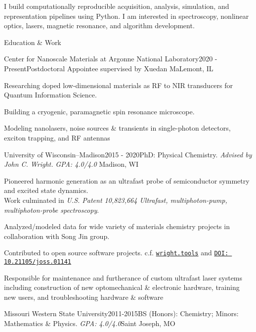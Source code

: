 \documentclass{resume} %
\begin{document}

I build computationally reproducible acquisition, analysis, simulation, and representation pipelines using Python.
I am interested in spectroscopy, nonlinear optics, lasers, magnetic resonance, and algorithm development.





   

\begin{rSection}{Education \& Work}

\begin{rSubsection}{Center for Nanoscale Materials at Argonne National Laboratory}{2020 - Present}{Postdoctoral Appointee supervised by Xuedan Ma}{Lemont, IL}
	\item Researching doped low-dimensional materials as RF to NIR transducers for Quantum Information Science.
	\item Building a cryogenic, paramagnetic spin resonance microscope.
	\item Modeling nanolasers, noise sources \& transients in single-photon detectors, exciton trapping, and RF antennas  
\end{rSubsection}

\begin{rSubsection}{University of Wisconsin--Madison}{2015 - 2020}{PhD: Physical Chemistry. \emph{Advised by John C. Wright.} \emph{GPA: 4.0/4.0} }{Madison, WI}
	\item Pioneered harmonic generation as an ultrafast probe of semiconductor symmetry and excited state dynamics.\\ Work culminated in \emph{U.S. Patent 10,823,664  Ultrafast, multiphoton-pump, multiphoton-probe spectroscopy}.
	\item Analyzed/modeled data for wide variety of materials chemistry projects in collaboration with Song Jin group. 
	\item Contributed to open source software projects. c.f. \href{http://wright.tools}{\texttt{wright.tools}} and \href{http://doi.org/10.21105/joss.01141}{\texttt{DOI: 10.21105/joss.01141}}
	\item Responsible for maintenance and furtherance of custom ultrafast laser systems including construction of new optomechanical \& electronic hardware, training new users, and troubleshooting hardware \& software

\end{rSubsection}

\begin{rSubsectionlistless}{Missouri Western State University}{2011-2015}{BS (Honors): Chemistry; Minors: Mathematics \& Physics. \emph{GPA: 4.0/4.0}}{Saint Joseph, MO} 
\end{rSubsectionlistless}



\end{rSection}
\end{document}
